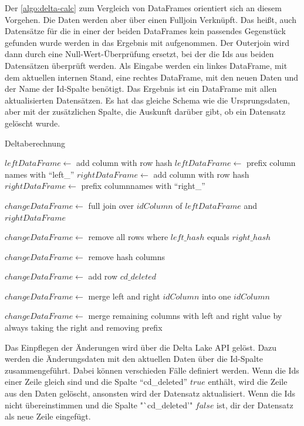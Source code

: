 Der \cref{algo:delta-calc} zum Vergleich von DataFrames orientiert sich an diesem Vorgehen.
Die Daten werden aber über einen Fulljoin Verknüpft. 
Das heißt, auch Datensätze für die in einer der beiden DataFrames kein passendes Gegenstück gefunden wurde werden in das Ergebnis mit aufgenommen.
Der Outerjoin wird dann durch eine Null-Wert-Überprüfung ersetzt, bei der die Ids aus beiden Datensätzen überprüft werden.
Als Eingabe werden ein linkes DataFrame, mit dem aktuellen internen Stand, eine rechtes DataFrame, mit den neuen Daten und der Name der Id-Spalte benötigt.
Das Ergebnis ist ein DataFrame mit allen aktualisierten Datensätzen.
Es hat das gleiche Schema wie die Ursprungsdaten, aber mit der zusätzlichen Spalte, die Auskunft darüber gibt, ob ein Datensatz gelöscht wurde.

\begin{algorithm}
    \caption{Deltaberechnung}
    \label{algo:delta-calc}
    $leftDataFrame \gets$ add column with row hash \;
    $leftDataFrame \gets$ prefix column names with "`left\_"' \;
    $rightDataFrame \gets$ add column with row hash \;
    $rightDataFrame \gets$ prefix columnnames with "`right\_"' \;

    $changeDataFrame \gets$ full join over $idColumn$ of $leftDataFrame$ and $rightDataFrame$ \;

    $changeDataFrame \gets$ remove all rows where $left\_hash$ equals $right\_hash$ \;

    $changeDataFrame \gets$ remove hash columns

    $changeDataFrame \gets$ add row $cd\_deleted$ \;

    $changeDataFrame \gets$ merge left and right $idColumn$ into one $idColumn$

    $changeDataFrame \gets$ merge remaining columns with left and right value by always taking the right and removing prefix

\end{algorithm}

Das Einpflegen der Änderungen wird über die Delta Lake API gelöst.
Dazu werden die Änderungsdaten mit den aktuellen Daten über die Id-Spalte zusammengeführt.
Dabei können verschieden Fälle definiert werden.
Wenn die Ids einer Zeile gleich sind und die Spalte "`cd\_deleted"' $true$ enthält, wird die Zeile aus den Daten gelöscht, ansonsten wird der Datensatz aktualisiert.
Wenn die Ids nicht übereinstimmen und die Spalte "`cd\_deleted'" $false$ ist, dir der Datensatz als neue Zeile eingefügt.

